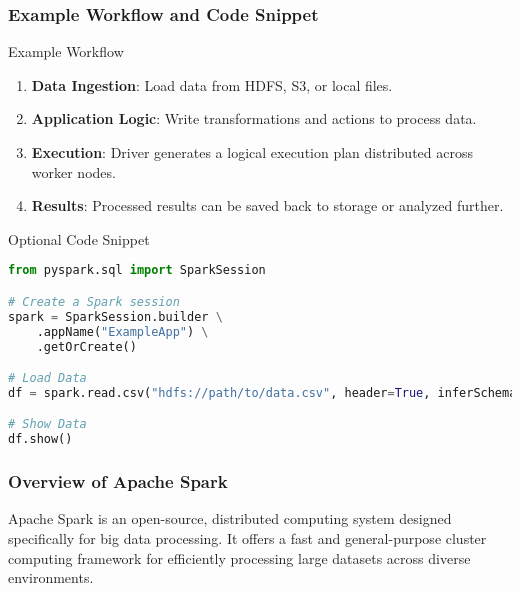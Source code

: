 \documentclass{beamer}
\begin{document}
\begin{frame}[fragile]
    \frametitle{Example Workflow and Code Snippet}
    
    \begin{block}{Example Workflow}
        \begin{enumerate}
            \item \textbf{Data Ingestion}: Load data from HDFS, S3, or local files.
            \item \textbf{Application Logic}: Write transformations and actions to process data.
            \item \textbf{Execution}: Driver generates a logical execution plan distributed across worker nodes.
            \item \textbf{Results}: Processed results can be saved back to storage or analyzed further.
        \end{enumerate}
    \end{block}

    \begin{block}{Optional Code Snippet}
    \begin{lstlisting}[language=Python]
from pyspark.sql import SparkSession

# Create a Spark session
spark = SparkSession.builder \
    .appName("ExampleApp") \
    .getOrCreate()

# Load Data
df = spark.read.csv("hdfs://path/to/data.csv", header=True, inferSchema=True)

# Show Data
df.show()
    \end{lstlisting}
    \end{block}
\end{frame}

\begin{frame}[fragile]
    \frametitle{Overview of Apache Spark}
    Apache Spark is an open-source, distributed computing system designed specifically for big data processing. 
    It offers a fast and general-purpose cluster computing framework for efficiently processing large datasets across diverse environments.
\end{frame}
\end{document}

